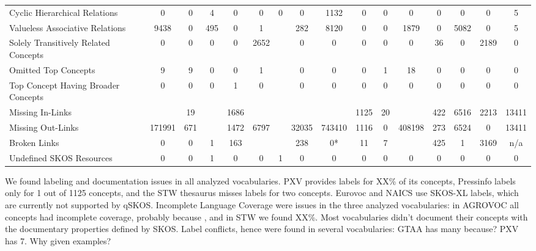 \begin{table}[h]
\begin{center}
{\begin{tabular}{p{4cm}ccccccccccccccc}
Cyclic Hierarchical Relations & 0 & 0 & 4 & 0 & 0 & 0 & 0 & 1132 & 0 & 0 & 0 & 0 & 0 & 0 & 5 \\

Valueless Associative Relations & 9438 & 0 & 495 & 0 & 1 && 282 & 8120 & 0 & 0 & 1879 & 0 & 5082 & 0 & 5 \\

Solely Transitively Related Concepts & 0 & 0 & 0 & 0 & 2652 && 0 & 0 & 0 & 0 & 0 & 36 & 0 & 2189 & 0 \\

Omitted Top Concepts & 9 & 9 & 0 & 0 & 1 && 0 & 0 & 0 & 1 & 18 & 0 & 0 & 0 & 0 \\

Top Concept Having Broader Concepts & 0 & 0 & 0 & 1 & 0 && 0 & 0 & 0 & 0 & 0 & 0 & 0 & 0 & 0 \\

\midrule

Missing In-Links && 19 && 1686 &&&&& 1125 & 20 && 422 & 6516 & 2213 & 13411 \\

Missing Out-Links & 171991 & 671 && 1472 & 6797 && 32035 & 743410 & 1116 & 0 & 408198 & 273 & 6524 & 0 & 13411 \\

Broken Links & 0 & 0 & 1 & 163 &&& 238 & 0* & 11 & 7 && 425 & 1 & 3169 & n/a \\


Undefined SKOS Resources & 0 & 0 & 1 & 0 & 0 & 1 & 0 & 0 & 0 & 0 & 0 & 0 & 0 & 0 & 0  \\

\bottomrule
\end{tabular}
}
\end{center}
\end{table}

We found labeling and documentation issues in all analyzed vocabularies. PXV provides labels for XX\% of its concepts, Pressinfo labels only for 1 out of 1125 concepts, and the STW thesaurus misses labels for two concepts. Eurovoc and NAICS use SKOS-XL labels, which are currently not supported by qSKOS.
Incomplete Language Coverage were issues in the three analyzed vocabularies: in AGROVOC all concepts had incomplete coverage, probably because , and in STW we found XX\%.
Most vocabularies didn't document their concepts with the documentary properties defined by SKOS.
Label conflicts, hence  were found in several vocabularies: GTAA has many because? PXV has 7. Why given examples?

